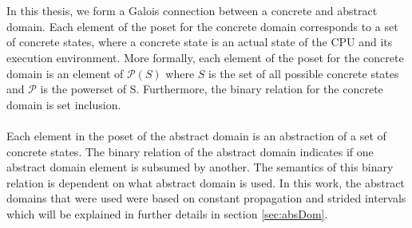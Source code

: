 \documentclass{kththesis}
\begin{document}
\\ \\
In this thesis, we form a Galois connection between a concrete and abstract domain. Each element of the poset for the concrete domain corresponds to a set of concrete states, where a concrete state is an actual state of the CPU and its execution environment. More formally, each element of the poset for the concrete domain is an element of $\mathcal{P}(S)$ where $S$ is the set of all possible concrete states and $\mathcal{P}$ is the powerset of S. Furthermore, the binary relation for the concrete domain is set inclusion. 
\\ \\
Each element in the poset of the abstract domain is an abstraction of a set of concrete states. The binary relation of the abstract domain indicates if one abstract domain element is subsumed by another. The semantics of this binary relation is dependent on what abstract domain is used. In this work, the abstract domains that were used were based on constant propagation and strided intervals which will be explained in further details in section \ref{sec:absDom}.




\end{document}
